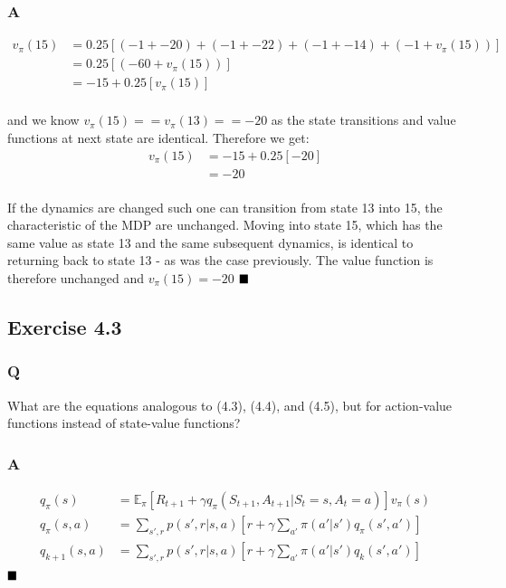 \subsubsection{A}
\begin{align}
v_\pi(15) &= 0.25 \left[(-1 + -20) + (-1 + -22) + (-1 + -14) + (-1 + v_\pi(15)) \right] \\
&= 0.25 \left[(-60 + v_\pi(15)) \right] \\
&= -15 + 0.25 \left[v_\pi(15) \right] \\
\end{align}

and we know $v_\pi(15) == v_\pi(13) == -20$ as the state transitions and value functions at next state are identical. Therefore we get:
\begin{align}
v_\pi(15) &= -15 + 0.25 \left[-20\right] \\
&= -20 \\
\end{align}

If the dynamics are changed such one can transition from state 13 into 15, the characteristic of the MDP are unchanged. Moving into state 15, which has the same value as state 13 and the same subsequent dynamics, is identical to returning back to state 13 - as was the case previously. The value function is therefore unchanged and $v_\pi(15) = -20$
$
\hfill \blacksquare
$

\subsection{Exercise 4.3}
\subsubsection{Q}
What are the equations analogous to (4.3), (4.4), and (4.5), but for action-value functions instead of state-value functions?
\subsubsection{A}
\begin{align}
q_\pi(s) &= \mathbb{E}_\pi \left[R_{t+1} + \gamma q_\pi(S_{t+1}, A_{t+1} | S_t = s, A_t = a)\right]v_\pi(s) \\
q_\pi(s,a) &= \sum_{s',r} p(s', r | s, a) \left[r + \gamma \sum_{a'} \pi(a' | s') q_\pi(s', a')\right] \\
q_{k+1}(s,a) &= \sum_{s',r} p(s', r | s, a) \left[r + \gamma \sum_{a'} \pi(a' | s') q_k(s', a')\right] \\
\end{align}
$
\hfill \blacksquare
$

